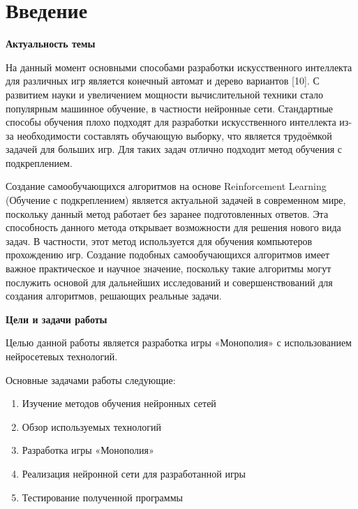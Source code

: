 \newpage
\section*{Введение}
\textbf{Актуальность темы}

На данный момент основными способами разработки искусственного интеллекта для различных игр является конечный автомат и дерево вариантов [10]. С развитием науки и увеличением мощности вычислительной техники стало популярным машинное обучение, в частности нейронные сети. Стандартные способы обучения плохо подходят для разработки искусственного интеллекта из-за необходимости составлять обучающую выборку, что является трудоёмкой задачей для больших игр. Для таких задач отлично подходит метод обучения с подкреплением. 

Создание самообучающихся алгоритмов на основе Reinforcement Learning (Обучение с подкреплением) является актуальной задачей в современном мире, поскольку данный метод работает без заранее подготовленных ответов. Эта способность данного метода открывает возможности для решения нового вида задач. В частности, этот метод используется для обучения компьютеров прохождению игр. Создание подобных самообучающихся алгоритмов имеет важное практическое и научное значение, поскольку такие алгоритмы могут послужить основой для дальнейших исследований и совершенствований для создания алгоритмов, решающих реальные задачи. 

\textbf{Цели и задачи работы}

Целью данной работы является разработка игры «Монополия» с использованием нейросетевых технологий.

Основные задачами работы следующие:
\begin{spacing}{0.9}
\begin{enumerate}
    \item Изучение методов обучения нейронных сетей
    \item Обзор используемых технологий
    \item Разработка игры «Монополия»
    \item Реализация нейронной сети для разработанной игры
    \item Тестирование полученной программы
\end{enumerate}
\end{spacing}